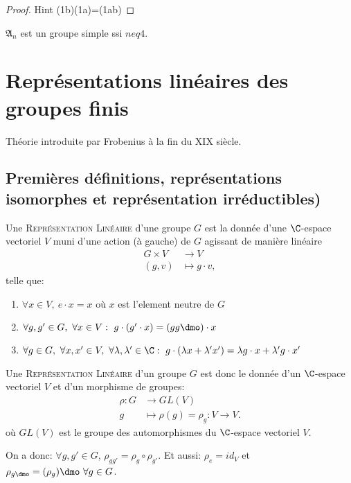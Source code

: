 \begin{proof}
	Hint (1b)(1a)=(1ab)
\end{proof}

\begin{theorem}[Galois]
	$\mathfrak{A}_n$ est un groupe simple ssi $n eq 4$.
\end{theorem}

\chapter{Représentations linéaires des groupes finis}

Théorie introduite par Frobenius à la fin du XIX siècle.

\section{Premières définitions, représentations isomorphes et représentation irréductibles)}

\begin{definition}
	Une \textsc{Représentation Linéaire} d'une groupe $G$ est la donnée d'une $\C$-espace vectoriel $V$ muni d'une action (à gauche) de $G$ agissant de manière linéaire
	\begin{align*}
		G\times V & \rightarrow V \\
		(g,v) & \mapsto g\cdot v,		
	\end{align*}
	telle que:
	\begin{enumerate}
		\item $\forall x\in V,\ e\cdot x=x$ où $x$ est l'element neutre de $G$
		\item $\forall g, g' \in G,\ \forall x\in V:\ g\cdot (g'\cdot x)=(gg\dmo)\cdot x$
		\item $\forall g\in G,\ \forall x,x'\in V,\ \forall \lambda,\lambda'\in\C:\ g\cdot(\lambda x+\lambda'x')=\lambda g\cdot x+\lambda' g\cdot x'$
	\end{enumerate}
\end{definition}

\begin{definition}
Une \textsc{Représentation Linéaire} d'un groupe $G$ est donc le donnée d'un $\C$-espace vectoriel $V$ et d'un morphisme de groupes:
\begin{align*}
	\rho:G &\rightarrow GL(V)\\
	g &\mapsto \rho(g)=\rho_g:V\rightarrow V.	
\end{align*}                
où $GL(V)$ est le groupe des automorphismes du $\C$-espace vectoriel $V$.

On a donc: $\forall g,g'\in G$, $\rho_{gg'}=\rho_g\circ \rho_{g'}$. Et aussi: $\rho_e=id_V$ et $\rho_{g\dmo}=(\rho_g)\dmo\ \forall g\in G$.
\end{definition}

